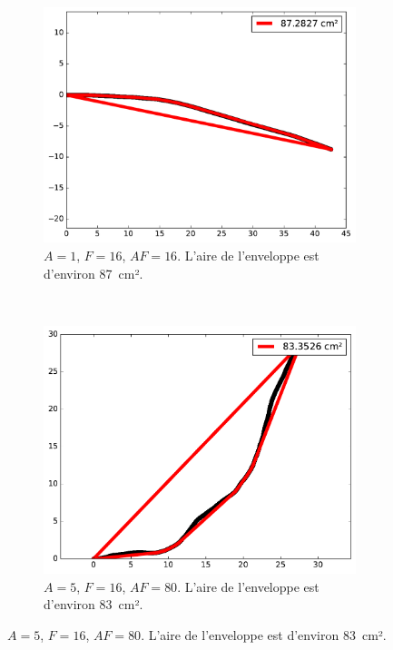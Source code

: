 	
	\begin{figure}[htb]
		\centering
		\begin{subfigure}[t]{\subImgWarea}
			\centering
			\includegraphics[width=\textwidth]{figures/ch3/areaTraj_219_1_16}
			\caption[$A = 1$, $F=16$]{$A = 1$, $F=16$, $AF=16$. L'aire de l'enveloppe est d'environ 87~cm².}
			\label{fig:areaTraj_219_1_16}
		\end{subfigure}
		~
		\begin{subfigure}[t]{\subImgWarea}
			\centering
			\includegraphics[width=\textwidth]{figures/ch3/areaTraj_219_5_16}
			\caption[Enveloppe convexe, $A = 5$, $F=16$]{$A = 5$, $F=16$, $AF=80$. L'aire de l'enveloppe est d'environ 83~cm².}

\end{subfigure}
\end{figure}
